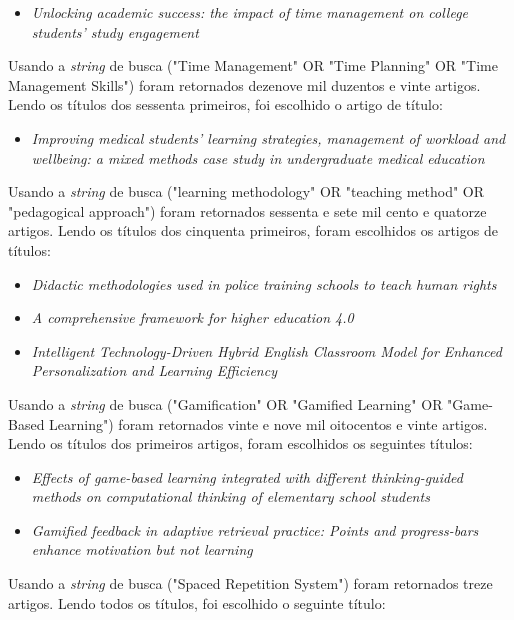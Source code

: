 \begin{itemize}
    \item \textit{Unlocking academic success: the impact of time management on college students' study engagement}
\end{itemize}

Usando a \textit{string} de busca ("Time Management" OR "Time Planning" OR "Time Management Skills") foram retornados dezenove mil duzentos e vinte artigos.
Lendo os títulos dos sessenta primeiros, foi escolhido o artigo de título:

\begin{itemize}
    \item \textit{Improving medical students' learning strategies, management of workload and wellbeing: a mixed methods case study in undergraduate medical education}
\end{itemize}

Usando a \textit{string} de busca ("learning methodology" OR "teaching method" OR "pedagogical approach") foram retornados sessenta e sete mil cento e quatorze artigos.
Lendo os títulos dos cinquenta primeiros, foram escolhidos os artigos de títulos:

\begin{itemize}
    \item \textit{Didactic methodologies used in police training schools to teach human rights}
    \item \textit{A comprehensive framework for higher education 4.0}
    \item \textit{Intelligent Technology-Driven Hybrid English Classroom Model for Enhanced Personalization and Learning Efficiency}
\end{itemize}

Usando a \textit{string} de busca ("Gamification" OR "Gamified Learning" OR "Game-Based Learning") foram retornados vinte e nove mil oitocentos e vinte artigos.
Lendo os títulos dos primeiros artigos, foram escolhidos os seguintes títulos:

\begin{itemize}
    \item \textit{Effects of game-based learning integrated with different thinking-guided methods on computational thinking of elementary school students}
    \item \textit{Gamified feedback in adaptive retrieval practice: Points and progress-bars enhance motivation but not learning}
\end{itemize}

Usando a \textit{string} de busca ("Spaced Repetition System") foram retornados treze artigos.
Lendo todos os títulos, foi escolhido o seguinte título:

